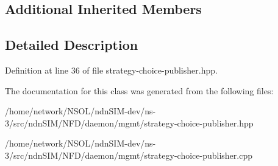 \subsection*{Additional Inherited Members}


\subsection{Detailed Description}


Definition at line 36 of file strategy-\/choice-\/publisher.\+hpp.



The documentation for this class was generated from the following files\+:\begin{DoxyCompactItemize}
\item 
/home/network/\+N\+S\+O\+L/ndn\+S\+I\+M-\/dev/ns-\/3/src/ndn\+S\+I\+M/\+N\+F\+D/daemon/mgmt/strategy-\/choice-\/publisher.\+hpp\item 
/home/network/\+N\+S\+O\+L/ndn\+S\+I\+M-\/dev/ns-\/3/src/ndn\+S\+I\+M/\+N\+F\+D/daemon/mgmt/strategy-\/choice-\/publisher.\+cpp\end{DoxyCompactItemize}
